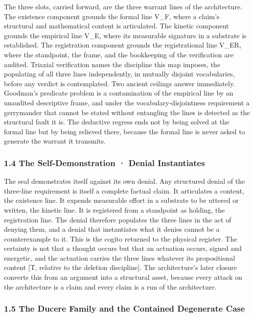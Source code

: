 \documentclass[10pt,twocolumn]{article}
\begin{document}
The three slots, carried forward, are the three warrant lines of the
architecture. The existence component grounds the formal line V\_F,
where a claim's structural and mathematical content is articulated. The
kinetic component grounds the empirical line V\_E, where its measurable
signature in a substrate is established. The registration component
grounds the registrational line V\_ER, where the standpoint, the frame,
and the bookkeeping of the verification are audited. Triaxial
verification names the discipline this map imposes, the populating of
all three lines independently, in mutually disjoint vocabularies, before
any verdict is contemplated. Two ancient ceilings answer immediately.
Goodman's predicate problem is a contamination of the empirical line by
an unaudited descriptive frame, and under the vocabulary-disjointness
requirement a gerrymander that cannot be stated without entangling the
lines is detected as the structural fault it is. The deductive regress
ends not by being solved at the formal line but by being relieved there,
because the formal line is never asked to generate the warrant it
transmits.

\hypertarget{the-self-demonstration-denial-instantiates}{%
\subsubsection{1.4 The Self-Demonstration · Denial
Instantiates}\label{the-self-demonstration-denial-instantiates}}

The seal demonstrates itself against its own denial. Any structured
denial of the three-line requirement is itself a complete factual claim.
It articulates a content, the existence line. It expends measurable
effort in a substrate to be uttered or written, the kinetic line. It is
registered from a standpoint as holding, the registration line. The
denial therefore populates the three lines in the act of denying them,
and a denial that instantiates what it denies cannot be a counterexample
to it. This is the cogito returned to the physical register. The
certainty is not that a thought occurs but that an actuation occurs,
signed and energetic, and the actuation carries the three lines whatever
its propositional content {[}T, relative to the deletion discipline{]}.
The architecture's later closure converts this from an argument into a
structural asset, because every attack on the architecture is a claim
and every claim is a run of the architecture.

\hypertarget{the-ducere-family-and-the-contained-degenerate-case}{%
\subsubsection{1.5 The Ducere Family and the Contained Degenerate
Case}\label{the-ducere-family-and-the-contained-degenerate-case}}
\end{document}
